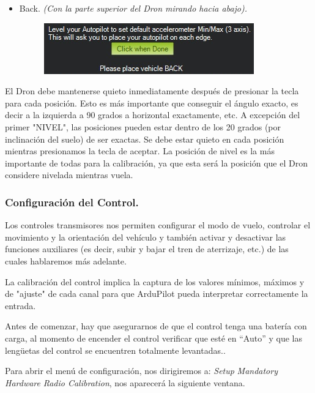 \begin{itemize}
	\item Back. \textit{(Con la parte superior del Dron mirando hacia abajo).}
	\begin{figure}[H]
		\centering
		\includegraphics[width=0.6\linewidth]{imagenes/conf6}
		\caption{}
		\label{fig:conf1}
	\end{figure}
	
	
\end{itemize}

El Dron debe mantenerse quieto inmediatamente después de presionar la tecla para cada posición. Esto es más importante que conseguir el ángulo exacto, es decir  a la izquierda a 90 grados a horizontal exactamente, etc. A excepción del primer "NIVEL", las posiciones pueden estar dentro de los 20 grados (por inclinación del suelo) de ser exactas. Se debe estar quieto en cada posición mientras presionamos la tecla de aceptar.
La posición de nivel es la más importante de todas para la calibración, ya que esta será la posición que el Dron considere nivelada mientras vuela.

\subsubsection{Configuración del Control.}

Los controles transmisores nos permiten configurar el modo de vuelo, controlar el movimiento y la orientación del vehículo y también activar y desactivar las funciones auxiliares (es decir, subir y bajar el tren de aterrizaje, etc.) de las cuales hablaremos más adelante.

La calibración del control implica la captura de los valores mínimos, máximos y de "ajuste" de cada canal para que ArduPilot pueda interpretar correctamente la entrada.

Antes de comenzar, hay que asegurarnos de que el control tenga una batería con carga, al momento de encender el control verificar que esté en “Auto” y que las lengüetas del control se encuentren totalmente levantadas..

Para abrir el menú de configuración, nos dirigiremos a:
\textit{Setup} \textrightarrow \textit{ Mandatory Hardware} \textrightarrow \textit{Radio Calibration}, nos aparecerá la siguiente ventana.

